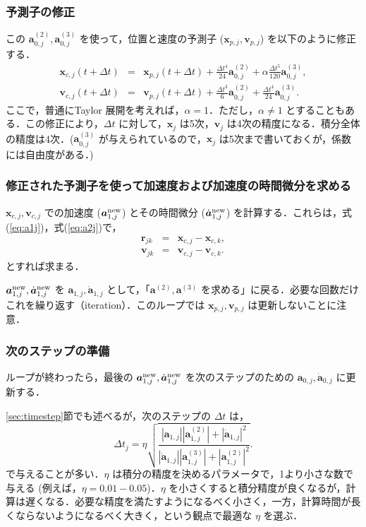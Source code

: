 \documentclass[11pt,a4paper,oneside,onecolumn]{jreport}
\begin{document}
\subsubsection{予測子の修正}
この ${\bm a}_{0,j}^{(2)}, {\bm a}_{0,j}^{(3)}$ を使って，位置と速度の予測子 (${\bm x}_{p,j}, {\bm v}_{p,j}$) を以下のように修正する．
\begin{eqnarray}
{\bm x}_{c,j} (t + \Delta t) & = & {\bm x}_{p,j} (t + \Delta t) +  \frac{\Delta t ^4}{24} {\bm a}_{0,j}^{(2)} + \alpha \frac{\Delta t ^5}{120} {\bm a}_{0,j}^{(3)}, \\
{\bm v}_{c,j} (t + \Delta t) & = & {\bm v}_{p,j} (t +\Delta t) + \frac{\Delta t ^3}{6} {\bm a}_{0,j}^{(2)} + \frac{\Delta t ^4}{24} {\bm a}_{0,j}^{(3)}. 
\end{eqnarray}
ここで，普通にTaylor 展開を考えれば，$\alpha = 1$．ただし，$\alpha \not= 1$ とすることもある．この修正により，$\Delta t$ に対して，${\bm x}_j$ は5次，${\bm v}_j$ は4次の精度になる．積分全体の精度は4次．(${\bm a}_{0,j}^{(3)}$ が与えられているので，${\bm x}_j$ は5次まで書いておくが，係数には自由度がある．)

\subsubsection{修正された予測子を使って加速度および加速度の時間微分を求める}
${\bm x}_{c,j}, {\bm v}_{c,j}$ での加速度 (${\bm a}_{1,j}^{\rm new}$) とその時間微分 ($\dot{{\bm a}}_{1,j}^{\rm new}$) を計算する．これらは，式(\ref{eq:a1j})，式(\ref{eq:a2j})で，
\begin{eqnarray}
{\bm r}_{jk} & = & {\bm x}_{c,j} - {\bm x}_{c,k}, \\
{\bm v}_{jk} & = & {\bm v}_{c,j} - {\bm v}_{c,k}. 
\end{eqnarray}
とすれば求まる．

${\bm a}_{1,j}^{\rm new}, \dot{{\bm a}}_{1,j}^{\rm new}$ を ${\bm a}_{1,j}, \dot{{\bm a}}_{1,j}$ として，「${\bm a}^{(2)}, {\bm a}^{(3)}$ を求める」に戻る．必要な回数だけこれを繰り返す（iteration）．このループでは ${\bm x}_{p,j}, {\bm v}_{p,j}$ は更新しないことに注意．

\subsubsection{次のステップの準備}
ループが終わったら，最後の ${\bm a}_{1,j}^{\rm new}, \dot{{\bm a}}_{1,j}^{\rm new}$ を次のステップのための ${\bm a}_{0,j}, \dot{{\bm a}}_{0,j}$ に更新する．

\ref{sec:timestep}節でも述べるが，次のステップの $\Delta t$ は，
\begin{equation}
\Delta t_j = \eta \sqrt{\frac{| {\bm a}_{1,j} | | {\bm a}_{1,j}^{(2)} | + | \dot{{\bm a}}_{1,j} | ^2}{| \dot{{\bm a}}_{1,j} | | {\bm a}_{1,j}^{(3)} | + | {\bm a}_{1,j}^{(2)} | ^2}}.
\end{equation}
で与えることが多い．$\eta$ は積分の精度を決めるパラメータで，1より小さな数で与える (例えば，$\eta = 0.01 - 0.05$)．$\eta$ を小さくすると積分精度が良くなるが，計算は遅くなる．必要な精度を満たすようになるべく小さく，一方，計算時間が長くならないようになるべく大きく，という観点で最適な $\eta$ を選ぶ．
\end{document}
